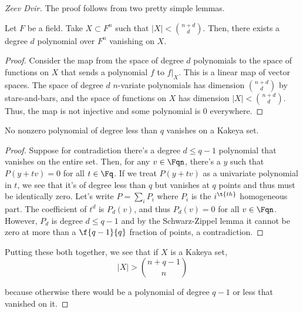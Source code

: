 \begin{proof}[Zeev Dvir]
    The proof follows from two pretty simple lemmas. 
    \begin{lemma}
        Let $F$ be a field. Take $X \subset F^n$ such that $|X| < \binom{n+d}{d}$. Then, there exists a degree $d$ polynomial over $F^n$ vanishing on $X$. 
    \end{lemma}
    \begin{proof}
        Consider the map from the space of degree $d$ polynomials to the space of functions on $X$ that sends a polynomial $f$ to $f|_X$. This is a linear map of vector spaces. The space of degree $d$ $n$-variate polynomials has dimension $\binom{n+d}{d}$ by stars-and-bars, and the space of functions on $X$ has dimension $|X| < \binom{n+d}{d}$. Thus, the map is not injective and some polynomial is $0$ everywhere. 
        
    \end{proof}

    \begin{lemma}
        No nonzero polynomial of degree less than $q$ vanishes on a Kakeya set. 
    \end{lemma}

    \begin{proof}
        Suppose for contradiction there's a degree $d \leq q-1$ polynomial that vanishes on the entire set. Then, for any $v \in \Fqn$, there's a $y$ such that $P(y+tv) = 0$ for all $t \in \Fq$. If we treat $P(y+tv)$ as a univariate polynomial in $t$, we see that it's of degree less than $q$ but vanishes at $q$ points and thus must be identically zero. Let's write $P = \sum_i P_i$ where $P_i$ is the $i^{\t{th}}$ homogeneous part. The coefficient of $t^d$ is $P_d(v)$, and thus $P_d(v) = 0$ for all $v \in \Fqn$. However, $P_d$ is degree $d \leq q-1$ and by the Schwarz-Zippel lemma it cannot be zero at more than a $\f{q-1}{q}$ fraction of points, a contradiction. 
    \end{proof}

    Putting these both together, we see that if $X$ is a Kakeya set, 
    \begin{equation}
        |X| > \binom{n+q-1}{n}
    \end{equation}

    because otherwise there would be a polynomial of degree $q-1$ or less that vanished on it. 
    
\end{proof}



